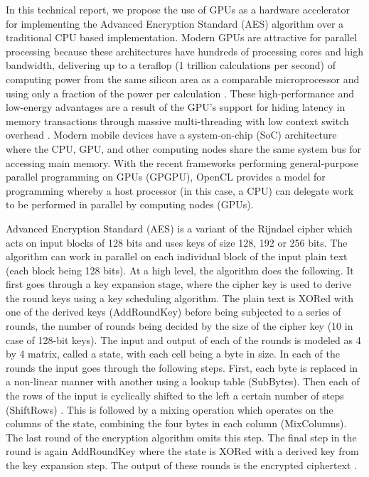 \documentclass[conference,10pt]{IEEEtran}
\begin{document}
In this technical report, we propose the use of GPUs as a hardware accelerator for implementing the 
Advanced Encryption Standard (AES) algorithm over a traditional CPU based implementation.  Modern 
GPUs are attractive for parallel processing because these architectures have hundreds of processing 
cores and high bandwidth, delivering up to a teraflop (1 trillion calculations per second) of 
computing power from the same silicon area as a comparable microprocessor and using only a fraction 
of the power per calculation \cite{myth}. These high-performance and low-energy advantages are a 
result of the GPU's support for hiding latency in memory transactions through massive 
multi-threading with low context switch overhead \cite{aes_gpu}.  Modern mobile devices have a 
system-on-chip (SoC) architecture where the CPU, GPU, and other computing nodes share the same 
system bus for accessing main memory. With the recent frameworks performing general-purpose parallel 
programming on GPUs (GPGPU), OpenCL provides a model for programming whereby a host processor (in 
this case, a CPU) can delegate work to be performed in parallel by computing nodes (GPUs).

Advanced Encryption Standard (AES) is a variant of the Rijndael cipher which acts on input blocks 
of 128 bits and uses keys of size 128, 192 or 256 bits. The algorithm can work in parallel on each 
individual block of the input plain text (each block being 128 bits). At a high level, the algorithm 
does the following. It first goes through a key expansion stage, where the cipher key is used to 
derive the round keys using a key scheduling algorithm. The plain text is XORed with one of the 
derived keys (AddRoundKey) before being subjected to a series of rounds, the number of rounds being 
decided by the size of the cipher key (10 in case of 128-bit keys). The input and output of each of 
the rounds is modeled as 4 by 4 matrix, called a state, with each cell being a byte in size. In each of 
the rounds the input goes through the following steps. First, each byte is replaced in a non-linear 
manner with another using a lookup table (SubBytes). Then each of the rows of the input is 
cyclically shifted to the left a certain number of steps (ShiftRows) . This is followed by a mixing 
operation which operates on the columns of the state, combining the four bytes in each 
column (MixColumns). The last round of the encryption algorithm omits this step. The final step in 
the round is again AddRoundKey where the state is XORed with a derived key from the key expansion 
step. The output of these rounds is the encrypted ciphertext \cite{aes1,aes2}.
\end{document}
